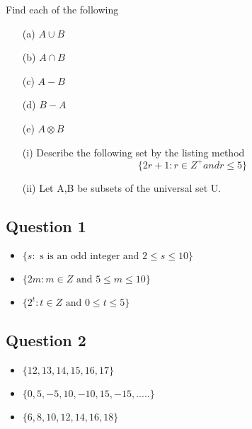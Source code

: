 \documentclass[]{report}
\begin{document}
\noindent Find each of the following
\begin{itemize}
	\item[(a)] $A \cup B $
	\item[(b)] $A \cap B $
	\item[(c)] $A-B$
	\item[(d)] $B-A$
	\item[(e)] $A \otimes B$
\end{itemize}
\newpage



\begin{itemize}
	\item[(i)] Describe the following set by the listing method
	\[ \{ 2r+1 : r \in Z^{+} and r \leq 5  \} \]
	\item[(ii)] Let A,B be subsets of the universal set U.
	
	
\end{itemize}

\subsection*{Question 1}

\begin{itemize}
	\item $\{ s :  \mbox{ s is an odd integer and } 2 \leq s \leq 10 \}$
	\item $\{ 2m :  m \in Z \mbox{ and }5 \leq m \leq 10 \}$
	\item $\{ 2^t :  t \in Z \mbox{ and } 0 \leq t \leq 5 \}$
\end{itemize}

\subsection*{Question 2}

\begin{itemize}
	\item $\{12,13,14,15,16,17\}$
	\item $\{0,5,-5,10,-10,15,-15,.....\}$
	\item $\{6,8,10,12,14,16,18\}$
\end{itemize}
\end{document}
